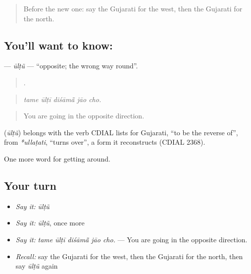 \label{lesson:GU-C414-ultu}



\begin{quote}
Before the new one: say the Gujarati for the west, then the Gujarati for the north.
\end{quote}

\subsection*{You'll want to know: }
\textbf{} — \emph{ūlṭũ} — \textquotedblleft{}opposite; the wrong way round\textquotedblright{}.

\begin{quote}
    .
\end{quote}

\begin{quote}
\emph{tame ūlṭī diśāmā̃ jāo cho.}
\end{quote}

\begin{quote}
You are going in the opposite direction.
\end{quote}

\begin{cousinweb}
\textbf{} (\emph{ūlṭũ}) belongs with the verb CDIAL lists for Gujarati, \textquotedblleft{}to be the reverse of\textquotedblright{}, from \emph{*ullaṭati}, \textquotedblleft{}turns over\textquotedblright{}, a form it reconstructs (CDIAL 2368).
\end{cousinweb}

\begin{grammarlens}[title={What you've built}]
One more word for getting around.
\end{grammarlens}

\subsection*{Your turn}
\begin{itemize}
\raggedright
  \item \emph{Say it:} \emph{ūlṭũ}
  \item \emph{Say it:} \emph{ūlṭũ}, once more
  \item \emph{Say it:} \emph{tame ūlṭī diśāmā̃ jāo cho.} — You are going in the opposite direction.
  \item \emph{Recall:} say the Gujarati for the west, then the Gujarati for the north, then say \emph{ūlṭũ} again
\end{itemize}

